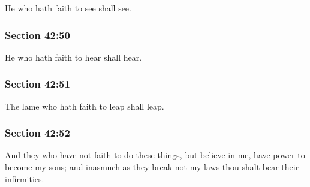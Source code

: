 		He who hath faith to see shall see.


	\subsubsection{Section 42:50} %
		\label{DC42-50}

		He who hath faith to hear shall hear.


	\subsubsection{Section 42:51} %
		\label{DC42-51}

		The lame who hath faith to leap shall leap.


	\subsubsection{Section 42:52} %
		\label{DC42-52}

		And they who have not faith to do these things, but believe in me, have power to become my sons; and inasmuch as they break not my laws thou shalt bear their infirmities.

